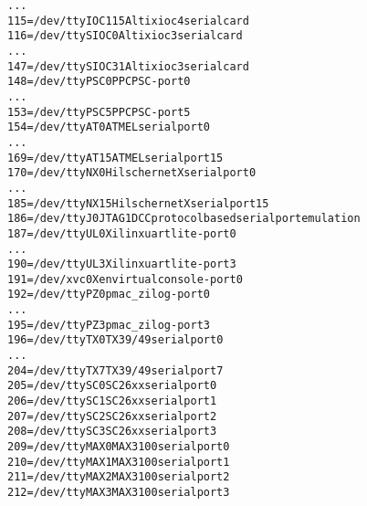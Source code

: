 \documentclass[a4paper,8pt,english]{sphinxmanual}
\begin{document}
\begin{alltt}
                    ...
                 115 = /dev/ttyIOC115           Altix ioc4 serial card
                 116 = /dev/ttySIOC0            Altix ioc3 serial card
                    ...
                 147 = /dev/ttySIOC31           Altix ioc3 serial card
                 148 = /dev/ttyPSC0             PPC PSC - port 0
                    ...
                 153 = /dev/ttyPSC5             PPC PSC - port 5
                 154 = /dev/ttyAT0              ATMEL serial port 0
                    ...
                 169 = /dev/ttyAT15             ATMEL serial port 15
                 170 = /dev/ttyNX0              Hilscher netX serial port 0
                    ...
                 185 = /dev/ttyNX15             Hilscher netX serial port 15
                 186 = /dev/ttyJ0               JTAG1 DCC protocol based serial port emulation
                 187 = /dev/ttyUL0              Xilinx uartlite - port 0
                    ...
                 190 = /dev/ttyUL3              Xilinx uartlite - port 3
                 191 = /dev/xvc0                Xen virtual console - port 0
                 192 = /dev/ttyPZ0              pmac\_zilog - port 0
                    ...
                 195 = /dev/ttyPZ3              pmac\_zilog - port 3
                 196 = /dev/ttyTX0              TX39/49 serial port 0
                    ...
                 204 = /dev/ttyTX7              TX39/49 serial port 7
                 205 = /dev/ttySC0              SC26xx serial port 0
                 206 = /dev/ttySC1              SC26xx serial port 1
                 207 = /dev/ttySC2              SC26xx serial port 2
                 208 = /dev/ttySC3              SC26xx serial port 3
                 209 = /dev/ttyMAX0             MAX3100 serial port 0
                 210 = /dev/ttyMAX1             MAX3100 serial port 1
                 211 = /dev/ttyMAX2             MAX3100 serial port 2
                 212 = /dev/ttyMAX3             MAX3100 serial port 3


\end{alltt}
\end{document}

